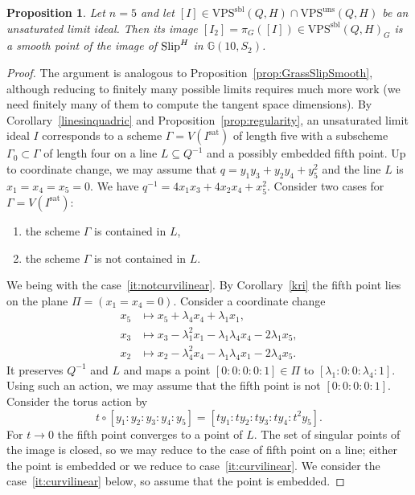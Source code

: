 \documentclass{amsart}
\newcommand{\Slip}{{\rm{Slip}}}
\def\Gr #1#2{{\mathbb G}\left(#1,#2\right)} %
\newcommand{\VPSsbl}{{\mathrm{VPS}}^{\mathrm{sbl}}(Q, H)}
\newcommand{\VPSuns}{{\mathrm{VPS}}^{\mathrm{uns}}(Q, H)}
\newcommand{\sat}{\mathrm{sat}}%
\newtheorem{proposition}[lemma]{\bf Proposition}
\begin{document}
\begin{proposition}\label{prop:GrassSlipSmoothFive}
    Let $n=5$ and let $[I]\in \VPSsbl \cap \VPSuns$ be an unsaturated limit ideal. Then its image $[I_2]=\pi_G([I])\in \VPSsbl_G$ is a smooth
    point of the image of $\Slip^H$ in $\Gr{10}{S_2}$.
\end{proposition}
\begin{proof}
    The argument is analogous to Proposition~\ref{prop:GrassSlipSmooth},
    although reducing to finitely many possible limits requires much more work
    (we need finitely many of them to compute the tangent space dimensions).
    By Corollary~\ref{linesinquadric} and
    Proposition~\ref{prop:regularity},
    an unsaturated limit ideal $I$ corresponds to a scheme
    $\Gamma=V(I^{\sat})$ of length five with a subscheme $\Gamma_0\subset
    \Gamma$ of length four on a line $L\subseteq Q^{-1}$ and a possibly
    embedded fifth point. Up to coordinate change, we may
    assume that $q = y_1y_3 + y_2y_4 + y_5^2$ and the line $L$ is $x_1 = x_4 = x_5
    = 0$. We have $q^{-1}=4x_1x_3 + 4x_2x_4 + x_5^2$.
    Consider two cases for $\Gamma = V(I^{\sat})$:
    \begin{enumerate}
        \item\label{it:curvilinear} the scheme $\Gamma$ is contained in $L$,
        \item\label{it:notcurvilinear} the scheme $\Gamma$ is not contained in $L$.
    \end{enumerate}
    We being with the case~\ref{it:notcurvilinear}. By Corollary~\ref{kri} the fifth point
    lies on the plane $\Pi = (x_1 = x_4 = 0)$.
    Consider a coordinate change
    \begin{align*}
        x_5 &\mapsto x_5 + \lambda_4x_4 +
        \lambda_1 x_1,\\
        x_3&\mapsto x_3 - \lambda_1^2x_1 - \lambda_1\lambda_4 x_4
        - 2\lambda_1x_5,\\
        x_2&\mapsto x_2 - \lambda_4^2x_4-\lambda_1\lambda_4
        x_1- 2\lambda_4x_5.
    \end{align*}
    It preserves $Q^{-1}$ and $L$ and maps a point $[0:0:0:0:1]\in \Pi$ to
    $[\lambda_1:0:0:\lambda_4:1]$. Using such an action, we may assume that
    the fifth point is not $[0:0:0:0:1]$.
    Consider the torus action by
    \[
        t\circ[y_1:y_2:y_3:y_4:y_5] = [ty_1:ty_2:ty_3:ty_4:t^2y_5].
    \]
    For $t\to 0$ the fifth point converges to a point of $L$.
    The set of singular points of the image is closed, so we may reduce to
    the case of fifth point on a line; either the point is embedded or we
    reduce to case~\ref{it:curvilinear}. We consider the
    case~\ref{it:curvilinear} below, so assume that the point is embedded.


\end{proof}
\end{document}
